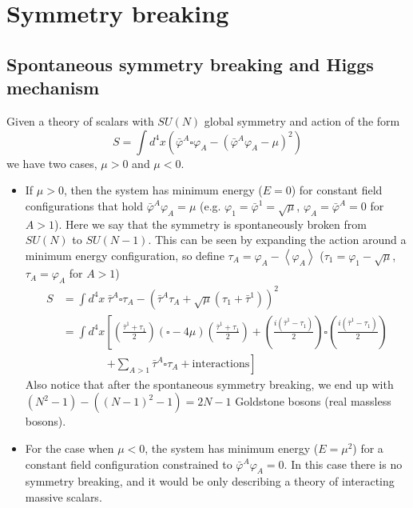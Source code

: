 \documentclass[a4paper,12pt]{article}
\numberwithin{equation}{section}
\numberwithin{exe}{section}
\newcommand{\m}{{\mu}}
\newcommand{\vphi}{{\varphi}}
\newcommand{\vphib}{{\bar\varphi}}
\newcommand{\taub}{{\bar\tau}}
\begin{document}
\newpage

\section{Symmetry breaking}

\subsection{Spontaneous symmetry breaking and Higgs mechanism}
Given a theory of scalars with $SU(N)$ global symmetry and action of the form
	\begin{equation}
	S = \int d^4x \left( \vphib^A\square \vphi_A - (\vphib^A\vphi_A - \m)^2 \right)
	\end{equation}
we have two cases, $\m>0$ and $\m<0$.

	\begin{itemize}
	\item If $\m>0$, then the system has minimum energy ($E=0$) for constant field configurations that hold $\vphib^A \vphi_A =\m$ (e.g. $\vphi_1 = \vphib^1 = \sqrt\m$, $\vphi_A=\vphib^A=0$ for $A>1$). Here we say that the symmetry is spontaneously broken from $SU(N)$ to $SU(N-1)$. This can be seen by expanding the action around a minimum energy configuration, so define $\tau_A = \vphi_A - \left< \vphi_A\right>$ ($\tau_1 = \vphi_1 - \sqrt\m$, $\tau_A = \vphi_A$ for $A>1$)
	\begin{align}
	S & = \int d^4x\ \taub^A \square \tau_A - \left(\taub^A \tau_A +\sqrt\m(\tau_1 + \taub^1)\right)^2 \nonumber \\
	& = \int d^4x \left[ \left(\frac{\taub^1+\tau_1}{2}\right)(\square -4\m)\left(\frac{\taub^1 + \tau_1}{2}\right) + \left(\frac{i(\taub^1 - \tau_1)}{2}\right)\square \left(\frac{i(\taub^1 - \tau_1)}{2}\right) \right. \nonumber \\
	& \qquad\qquad \left. + \sum_{A>1} \taub^A \square \tau_A + \text{interactions}\right]
	\end{align}
Also notice that after the spontaneous symmetry breaking, we end up with $(N^2 -1) - ((N-1)^2 - 1) = 2N-1$ Goldstone bosons (real massless bosons). 

	\item For the case when $\m<0$, the system has minimum energy ($E=\m^2$) for a constant field configuration constrained to $\vphib^A \vphi_A = 0$. In this case there is no symmetry breaking, and it would be only describing a theory of interacting massive scalars.
	\end{itemize}
\end{document}
